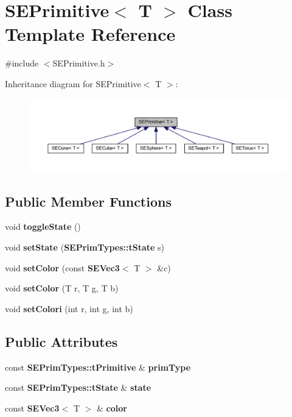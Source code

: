 \section{S\+E\+Primitive$<$ T $>$ Class Template Reference}
\label{class_s_e_primitive}


{\ttfamily \#include $<$S\+E\+Primitive.\+h$>$}



Inheritance diagram for S\+E\+Primitive$<$ T $>$\+:
\nopagebreak
\begin{figure}[H]
\begin{center}
\leavevmode
\includegraphics[width=350pt]{class_s_e_primitive__inherit__graph}
\end{center}
\end{figure}
\subsection*{Public Member Functions}
\begin{DoxyCompactItemize}
\item 
void {\bf toggle\+State} ()
\item 
void {\bf set\+State} ({\bf S\+E\+Prim\+Types\+::t\+State} s)
\item 
void {\bf set\+Color} (const {\bf S\+E\+Vec3}$<$ T $>$ \&c)
\item 
void {\bf set\+Color} (T r, T g, T b)
\item 
void {\bf set\+Colori} (int r, int g, int b)
\end{DoxyCompactItemize}
\subsection*{Public Attributes}
\begin{DoxyCompactItemize}
\item 
const {\bf S\+E\+Prim\+Types\+::t\+Primitive} \& {\bf prim\+Type}
\item 
const {\bf S\+E\+Prim\+Types\+::t\+State} \& {\bf state}
\item 
const {\bf S\+E\+Vec3}$<$ T $>$ \& {\bf color}
\end{DoxyCompactItemize}
